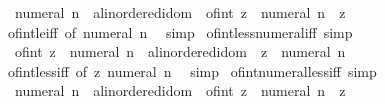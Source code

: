 \begin{isabellebody}
\ \ {\isachardoublequoteopen}{\isacharparenleft}{\kern0pt}numeral\ n\ {\isacharcolon}{\kern0pt}{\isacharcolon}{\kern0pt}\ {\isacharprime}{\kern0pt}a{\isacharcolon}{\kern0pt}{\isacharcolon}{\kern0pt}linordered{\isacharunderscore}{\kern0pt}idom{\isacharparenright}{\kern0pt}\ {\isasymle}\ of{\isacharunderscore}{\kern0pt}int\ z\ {\isasymlongleftrightarrow}\ numeral\ n\ {\isasymle}\ z{\isachardoublequoteclose}\isanewline
%
\isadelimproof
\ \ %
\endisadelimproof
%
\isatagproof
{}\isamarkupfalse%
\ of{\isacharunderscore}{\kern0pt}int{\isacharunderscore}{\kern0pt}le{\isacharunderscore}{\kern0pt}iff\ {\isacharbrackleft}{\kern0pt}of\ {\isachardoublequoteopen}numeral\ n{\isachardoublequoteclose}{\isacharbrackright}{\kern0pt}\ \isamarkupfalse%
\ simp%
\endisatagproof
{\isafoldproof}%
%
\isadelimproof
\isanewline
%
\endisadelimproof
\isanewline
{}\isamarkupfalse%
\ of{\isacharunderscore}{\kern0pt}int{\isacharunderscore}{\kern0pt}less{\isacharunderscore}{\kern0pt}numeral{\isacharunderscore}{\kern0pt}iff\ {\isacharbrackleft}{\kern0pt}simp{\isacharbrackright}{\kern0pt}{\isacharcolon}{\kern0pt}\isanewline
\ \ {\isachardoublequoteopen}of{\isacharunderscore}{\kern0pt}int\ z\ {\isacharless}{\kern0pt}\ {\isacharparenleft}{\kern0pt}numeral\ n\ {\isacharcolon}{\kern0pt}{\isacharcolon}{\kern0pt}\ {\isacharprime}{\kern0pt}a{\isacharcolon}{\kern0pt}{\isacharcolon}{\kern0pt}linordered{\isacharunderscore}{\kern0pt}idom{\isacharparenright}{\kern0pt}\ {\isasymlongleftrightarrow}\ z\ {\isacharless}{\kern0pt}\ numeral\ n{\isachardoublequoteclose}\isanewline
%
\isadelimproof
\ \ %
\endisadelimproof
%
\isatagproof
{}\isamarkupfalse%
\ of{\isacharunderscore}{\kern0pt}int{\isacharunderscore}{\kern0pt}less{\isacharunderscore}{\kern0pt}iff\ {\isacharbrackleft}{\kern0pt}of\ z\ {\isachardoublequoteopen}numeral\ n{\isachardoublequoteclose}{\isacharbrackright}{\kern0pt}\ \isamarkupfalse%
\ simp%
\endisatagproof
{\isafoldproof}%
%
\isadelimproof
\isanewline
%
\endisadelimproof
\isanewline
{}\isamarkupfalse%
\ of{\isacharunderscore}{\kern0pt}int{\isacharunderscore}{\kern0pt}numeral{\isacharunderscore}{\kern0pt}less{\isacharunderscore}{\kern0pt}iff\ {\isacharbrackleft}{\kern0pt}simp{\isacharbrackright}{\kern0pt}{\isacharcolon}{\kern0pt}\isanewline
\ \ {\isachardoublequoteopen}{\isacharparenleft}{\kern0pt}numeral\ n\ {\isacharcolon}{\kern0pt}{\isacharcolon}{\kern0pt}\ {\isacharprime}{\kern0pt}a{\isacharcolon}{\kern0pt}{\isacharcolon}{\kern0pt}linordered{\isacharunderscore}{\kern0pt}idom{\isacharparenright}{\kern0pt}\ {\isacharless}{\kern0pt}\ of{\isacharunderscore}{\kern0pt}int\ z\ {\isasymlongleftrightarrow}\ numeral\ n\ {\isacharless}{\kern0pt}\ z{\isachardoublequoteclose}\isanewline

\end{isabellebody}
